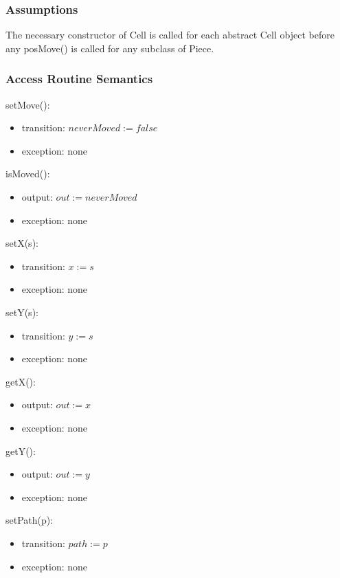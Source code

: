 \documentclass[12pt]{article}
\begin{document}
\subsubsection* {Assumptions}
The necessary constructor of Cell is called for each abstract Cell object before any
posMove() is called for any subclass of Piece. 

\subsubsection* {Access Routine Semantics}

setMove():
\begin{itemize}
\item transition: $neverMoved := false$
\item exception: none
\end{itemize}

\noindent isMoved():
\begin{itemize}
\item output: $out := neverMoved$
\item exception: none
\end{itemize}

\noindent setX(s):
\begin{itemize}
\item transition: $x := s$
\item exception: none
\end{itemize}

\noindent setY(s):
\begin{itemize}
\item transition: $y := s$
\item exception: none
\end{itemize}

\noindent getX():
\begin{itemize}
\item output: $out := x$
\item exception: none
\end{itemize}

\noindent getY():
\begin{itemize}
\item output: $out := y$
\item exception: none
\end{itemize}

\noindent setPath(p):
\begin{itemize}
\item transition: $path := p$ 
\item exception: none
\end{itemize}
\end{document}
